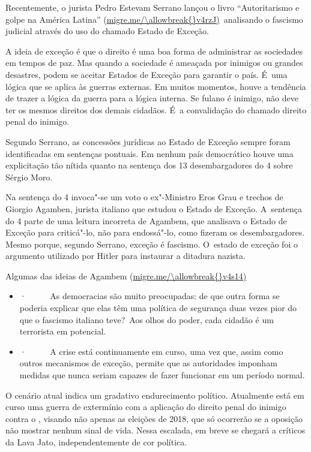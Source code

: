 Recentemente, o jurista Pedro Estevam Serrano lançou o livro
``Autoritarismo e golpe na América Latina''
(\url{migre.me/\allowbreak{}v4rzJ)}~analisando o fascismo judicial através do
uso do chamado Estado de Exceção.

A ideia de exceção é que o direito é uma boa forma de administrar as
sociedades em tempos de paz. Mas quando a sociedade é ameaçada por
inimigos ou grandes desastres, podem se aceitar Estados de Exceção para
garantir o país. É~uma lógica que se aplica às guerras externas. Em
muitos momentos, houve a tendência de trazer a lógica da guerra para a
lógica interna. Se fulano é inimigo, não deve ter os mesmos direitos dos
demais cidadãos. É~a convalidação do chamado direito penal do inimigo.

Segundo Serrano, as concessões jurídicas ao Estado de Exceção sempre
foram identificadas em sentenças pontuais. Em nenhum país democrático
houve uma explicitação tão nítida quanto na sentença dos 13
desembargadores do 4 sobre Sérgio Moro.

Na sentença do 4 invoca"-se um voto o ex"-Ministro Eros Grau e trechos
de Giorgio Agamben, jurista italiano que estudou o Estado de Exceção. A~sentença do 4 parte de uma leitura incorreta de Agambem, que
analisava o Estado de Exceção para criticá"-lo, não para endossá"-lo, como
fizeram os desembargadores. Mesmo porque, segundo Serrano, exceção é
fascismo. O~estado de exceção foi o argumento utilizado por Hitler para
instaurar a ditadura nazista.

Algumas das ideias de Agambem (\url{migre.me/\allowbreak{}v4s14)}

\begin{itemize}
\itemsep1pt\parskip0pt
\item
  ·~~~~~ As democracias são muito preocupadas: de que outra forma se
  poderia explicar que elas têm uma política de segurança duas vezes
  pior do que o fascismo italiano teve?~Aos olhos do poder, cada cidadão
  é um terrorista em potencial.
\item
  ·~~~~~ A crise está continuamente em curso, uma vez que, assim como
  outros mecanismos de exceção, permite que as autoridades imponham
  medidas que nunca seriam capazes de fazer funcionar em um período
  normal.
\end{itemize}

O cenário atual indica um gradativo endurecimento político. Atualmente
está em curso uma guerra de extermínio com a aplicação do direito penal
do inimigo contra o , visando não apenas as eleições de 2018, que só
ocorrerão se a oposição não mostrar nenhum sinal de vida. Nessa
escalada, em breve se chegará a críticos da Lava Jato, independentemente
de cor política.

